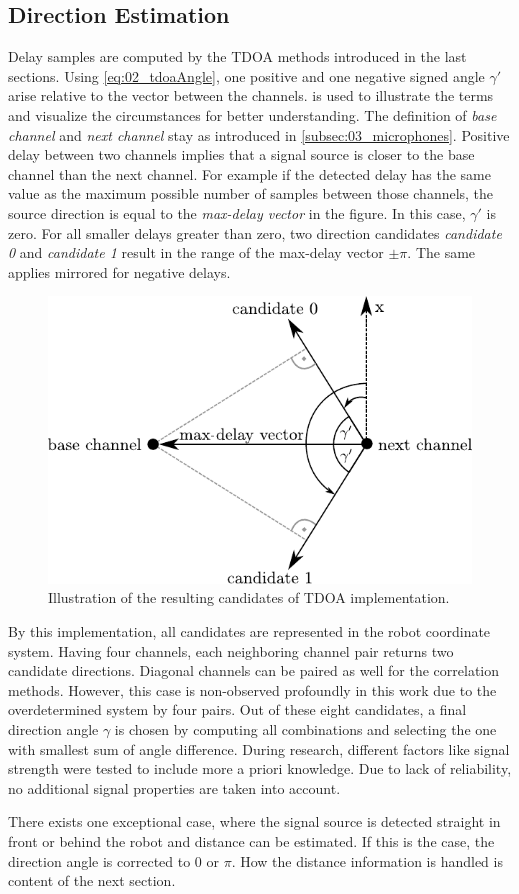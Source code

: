 \subsection{Direction Estimation}
\label{subsec:03_directionCandidates}

Delay samples are computed by the \ac{TDOA} methods introduced in the last
sections.
Using \cref{eq:02_tdoaAngle}, one positive and one negative signed angle $\gamma'$
arise relative to the vector between the channels.
 is used to illustrate the terms and visualize the
circumstances for better understanding.
The definition of \textit{base channel} and \textit{next channel} stay as introduced
in \cref{subsec:03_microphones}.
Positive delay between two channels implies that a signal source
is closer to the base channel than the next channel.
For example if the detected delay has the same value as the maximum possible number
of samples between those channels, the source direction is equal to the
\textit{max-delay vector} in the figure.
In this case, $\gamma'$ is zero.
For all smaller delays greater than zero, two direction candidates \textit{candidate 0}
and \textit{candidate 1} result in the range of the max-delay vector $\pm \pi$.
The same applies mirrored for negative delays.

\begin{figure}[ht]
	\centering
		\includegraphics[width=0.6\columnwidth]{figures/tdoa_code}
	\caption{Illustration of the resulting candidates of \ac{TDOA} implementation.}
	\label{fig:03_tdoaCode}
\end{figure}


By this implementation, all candidates are represented in the robot coordinate system.
Having four channels, each neighboring channel pair returns two candidate directions.
Diagonal channels can be paired as well for the correlation methods.
However, this case is non-observed profoundly in this work due to the overdetermined
system by four pairs.
Out of these eight candidates, a final direction angle $\gamma$ is chosen
by computing all combinations and selecting the one with smallest sum of angle difference.
During research, different factors like signal strength were tested to include
more a priori knowledge.
Due to lack of reliability, no additional signal properties are taken into account.

There exists one exceptional case, where the signal source is detected straight in front
or behind the robot and distance can be estimated.
If this is the case, the direction angle is corrected to 0 or $\pi$.
How the distance information is handled is content of the next section.
